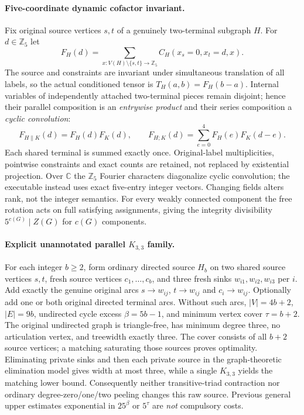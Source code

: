 \documentclass[11pt]{article}
\begin{document}
\paragraph{Five-coordinate dynamic cofactor invariant.}
Fix original source vertices $s,t$ of a genuinely two-terminal
subgraph $H$. For $d\in\mathbb Z_5$ let
\[
 F_H(d)=\sum_{x:V(H)\setminus\{s,t\}\to\mathbb Z_5}
     C_H(x_s=0,x_t=d,x).
\]
The source and constraints are invariant under simultaneous
translation of all labels, so the actual conditioned tensor is
$T_H(a,b)=F_H(b-a)$. Internal variables of independently attached
two-terminal pieces remain disjoint; hence their parallel
composition is an \emph{entrywise product} and their series
composition a \emph{cyclic convolution}:
\[
 F_{H\parallel K}(d)=F_H(d)F_K(d),\qquad
 F_{H;K}(d)=\sum_{e=0}^{4}F_H(e)F_K(d-e).
\]
Each shared terminal is summed exactly once. Original-label
multiplicities, pointwise constraints and exact counts are retained,
not replaced by existential projection. Over $\mathbb C$ the
$\mathbb Z_5$ Fourier characters diagonalize cyclic convolution;
the executable instead uses exact five-entry integer vectors.
Changing fields alters rank, not the integer semantics.
For every weakly connected component the free rotation acts
on full satisfying assignments, giving the integrity divisibility
$5^{c(G)}\mid Z(G)$ for $c(G)$ components.

\paragraph{Explicit unannotated parallel $K_{3,3}$ family.}
For each integer $b\ge2$, form ordinary directed source $H_b$
on two shared source vertices $s,t$, fresh source vertices
$c_1,\ldots,c_b$, and three fresh sinks $w_{i1},w_{i2},w_{i3}$
per $i$. Add exactly the genuine original arcs
$s\to w_{ij}$, $t\to w_{ij}$ and $c_i\to w_{ij}$.
Optionally add one or both original directed terminal arcs.
Without such arcs, $|V|=4b+2$, $|E|=9b$, undirected
cycle excess $\beta=5b-1$, and minimum vertex cover
$\tau=b+2$. The original undirected graph is triangle-free,
has minimum degree three, no articulation vertex, and treewidth
exactly three. The cover consists of all $b+2$ source vertices;
a matching saturating those sources proves optimality.
Eliminating private sinks and then each private source in
the graph-theoretic elimination model gives width at most three,
while a single $K_{3,3}$ yields the matching lower bound.
Consequently neither transitive-triad contraction nor ordinary
degree-zero/one/two peeling changes this raw source.
Previous general upper estimates exponential in $25^\beta$
or $5^\tau$ are \emph{not} compulsory costs.
\end{document}
